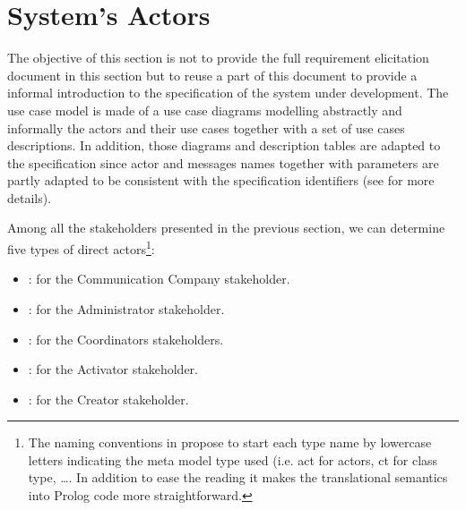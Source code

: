 \newpage

\section{System's Actors}
\label{sec:lu.uni.lassy.excalibur.examples.icrash-gendescr-actors}

The objective of this section is not to provide the full requirement elicitation document in this section but to reuse a part of this document to provide a informal introduction to the \msrmessir specification of the system under development. The use case model is made of a use case diagrams modelling abstractly and informally the actors and their use cases together with a set of use cases descriptions. 
In addition, those diagrams and description tables are adapted to the \msrmessir specification since actor and messages names together with parameters are partly adapted to be consistent with the specification identifiers (see \cite{messirbook} for more details). 

Among all the stakeholders presented in the previous section, we can determine five types of \glspl{direct actor}\footnote{The naming conventions in \msrmessir propose to start each type name by lowercase letters indicating the meta model type used (i.e. act for actors, ct for class type, \ldots. In addition to ease the reading it makes the translational semantics into Prolog code more straightforward.}: 
\begin{itemize}
  \item {}: for the Communication Company stakeholder.
  \item {}: for the Administrator stakeholder.
  \item {}: for the Coordinators stakeholders.
  \item {}: for the Activator stakeholder.
  \item {}: for the Creator stakeholder.
\end{itemize}
 
